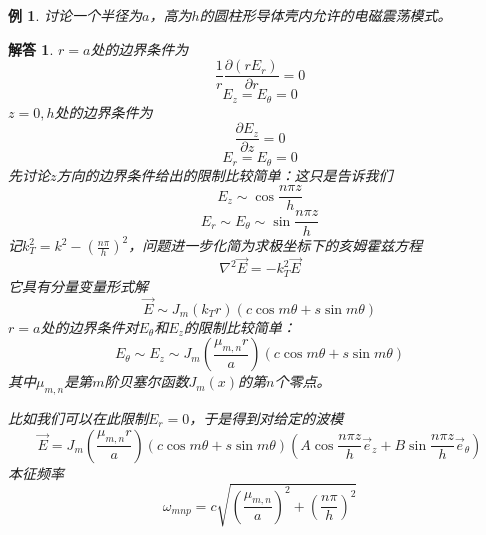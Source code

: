 \documentclass[a4paper,11pt]{ctexart}
\newtheorem{eg}{例}[section]
\newtheorem{ans}{解答}[section]
\newcommand{\beq}{\begin{equation}}
\newcommand{\eeq}{\end{equation}}
\newcommand{\pfrac}[2]{\frac{\partial #1}{\partial #2}}
\begin{document}
\begin{eg}
讨论一个半径为$a$，高为$h$的圆柱形导体壳内允许的电磁震荡模式。
\end{eg}
\begin{ans}
$r=a$处的边界条件为
\beq
\frac{1}{r}\pfrac{(rE_r)}{r} = 0
\eeq
\beq
E_z = E_\theta = 0
\eeq
$z=0,h$处的边界条件为
\beq
\pfrac{E_z}{z} = 0
\eeq
\beq
E_r = E_\theta = 0
\eeq
先讨论$z$方向的边界条件给出的限制比较简单：这只是告诉我们
\beq
E_z \sim \cos \frac{n\pi z}{h}
\eeq
\beq
E_r \sim E_\theta \sim \sin \frac{n\pi z}{h}
\eeq
记$k_T^2 = k^2 - \left(\frac{n\pi}{h}\right)^2$，问题进一步化简为求极坐标下的亥姆霍兹方程
\beq
\nabla^2 \vec E = - k_T^2 \vec E
\eeq
它具有分量变量形式解
\beq
\vec E \sim J_m(k_T r) \left(c\cos m\theta + s \sin m \theta\right)
\eeq
$r=a$处的边界条件对$E_\theta$和$E_z$的限制比较简单：
\beq
E_\theta \sim E_z \sim J_m(\frac{\mu_{m,n}r}{a})\left(c \cos m\theta + s \sin m \theta\right)
\eeq
其中$\mu_{m,n}$是第$m$阶贝塞尔函数$J_m(x)$的第$n$个零点。
\par
比如我们可以在此限制$E_r=0$，于是得到对给定的波模
\beq
\vec E = J_m(\frac{\mu_{m,n}r}{a})\left(c \cos m\theta + s \sin m \theta\right)(A \cos \frac{n\pi z}{h} \vec{e}_z + B\sin \frac{n\pi z}{h} \vec{e}_\theta)
\eeq
本征频率\beq
\omega_{mn p} = c\sqrt{\left( \frac{\mu_{m,n}}{a}\right)^2+\left( \frac{n\pi}{h}\right)^2}
\eeq
\end{ans}
\end{document}
